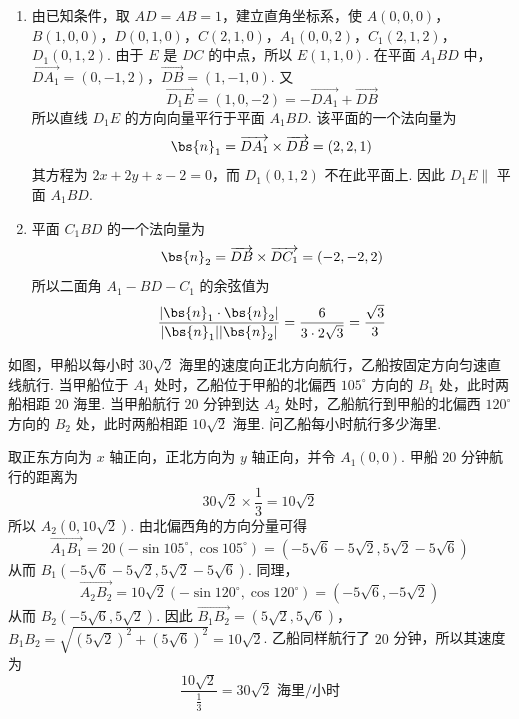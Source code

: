 \begin{solution}
\begin{enumerate}
\item 由已知条件，取 \(AD=AB=1\)，建立直角坐标系，使 \(A(0,0,0)\)，\(B(1,0,0)\)，\(D(0,1,0)\)，\(C(2,1,0)\)，\(A_1(0,0,2)\)，\(C_1(2,1,2)\)，\(D_1(0,1,2)\). 由于 \(E\) 是 \(DC\) 的中点，所以 \(E(1,1,0)\). 在平面 \(A_1BD\) 中，
\(\overrightarrow{DA_1}=(0,-1,2)\)，\(\overrightarrow{DB}=(1,-1,0)\).
又
\[
\overrightarrow{D_1E}=(1,0,-2)=-\overrightarrow{DA_1}+\overrightarrow{DB}
\]
所以直线 \(D_1E\) 的方向向量平行于平面 \(A_1BD\). 该平面的一个法向量为
\[
\bs{n}_1=\overrightarrow{DA_1}\times\overrightarrow{DB}=(2,2,1)
\]
其方程为 \(2x+2y+z-2=0\)，而 \(D_1(0,1,2)\) 不在此平面上. 因此 \(D_1E\parallel\) 平面 \(A_1BD\).
\item 平面 \(C_1BD\) 的一个法向量为
\[
\bs{n}_2=\overrightarrow{DB}\times\overrightarrow{DC_1}=(-2,-2,2)
\]
所以二面角 \(A_1-BD-C_1\) 的余弦值为
\[
\frac{|\bs{n}_1\cdot\bs{n}_2|}{|\bs{n}_1||\bs{n}_2|}=\frac{6}{3\cdot2\sqrt{3}}=\frac{\sqrt{3}}{3}
\]
\end{enumerate}
\end{solution}

\begin{problem}
如图，甲船以每小时 \(30 \sqrt{2}\) 海里的速度向正北方向航行，乙船按固定方向匀速直线航行. 当甲船位于 \(A_{1}\) 处时，乙船位于甲船的北偏西 \(105^{\circ}\) 方向的 \(B_{1}\) 处，此时两船相距 \(20\) 海里. 当甲船航行 \(20\) 分钟到达 \(A_{2}\) 处时，乙船航行到甲船的北偏西 \(120^{\circ}\) 方向的 \(B_{2}\) 处，此时两船相距 \(10 \sqrt{2}\) 海里. 问乙船每小时航行多少海里.

\end{problem}

\begin{solution}
取正东方向为 \(x\) 轴正向，正北方向为 \(y\) 轴正向，并令 \(A_1(0,0)\). 甲船 \(20\) 分钟航行的距离为
\[
30\sqrt{2}\times\frac{1}{3}=10\sqrt{2}
\]
所以 \(A_2(0,10\sqrt{2})\). 由北偏西角的方向分量可得
\[
\overrightarrow{A_1B_1}=20(-\sin105^{\circ},\cos105^{\circ})=(-5\sqrt{6}-5\sqrt{2},5\sqrt{2}-5\sqrt{6})
\]
从而 \(B_1(-5\sqrt{6}-5\sqrt{2},5\sqrt{2}-5\sqrt{6})\). 同理，
\[
\overrightarrow{A_2B_2}=10\sqrt{2}(-\sin120^{\circ},\cos120^{\circ})=(-5\sqrt{6},-5\sqrt{2})
\]
从而 \(B_2(-5\sqrt{6},5\sqrt{2})\). 因此
\(\overrightarrow{B_1B_2}=(5\sqrt{2},5\sqrt{6})\)，\(B_1B_2=\sqrt{(5\sqrt{2})^2+(5\sqrt{6})^2}=10\sqrt{2}\).
乙船同样航行了 \(20\) 分钟，所以其速度为
\[
\frac{10\sqrt{2}}{\frac{1}{3}}=30\sqrt{2}\text{ 海里/小时}
\]
\end{solution}

